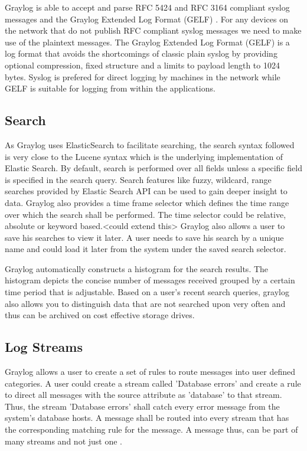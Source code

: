 \documentclass[9pt,twocolumn,twoside]{../../styles/osajnl}
\begin{document}
Graylog is able to accept and parse RFC 5424 \CE and RFC 3164 \CE compliant
syslog messages and the Graylog Extended Log Format (GELF)
\cite{www-graylog-sending_data}. For any devices on the network that
do not publish RFC compliant syslog messages we need to make use of
the plaintext messages.  The Graylog Extended Log Format (GELF)
is a
log format that avoids the shortcomings of classic plain syslog by
providing optional compression, fixed structure and a limits to
payload length to 1024 bytes. Syslog is prefered \SE for direct logging by
machines in the network while GELF is suitable for logging from within
the applications.

\subsection{Search}

As Graylog uses ElasticSearch to facilitate searching, the search
syntax followed is very close to the Lucene syntax which is the
underlying implementation of Elastic Search. By default, search is
performed over all fields unless a specific field is specified in the
search query. Search features like fuzzy, wildcard, range searches
provided by Elastic Search API can be used to gain deeper insight to
data.  Graylog also provides a time frame selector which defines the
time range over which the search shall be performed. The time selector
could be relative, absolute or keyword based.<could extend this>
Graylog also allows a user to save his searches to view it later. A
user needs to save his search by a unique name and could load it later
from the system under the saved search selector.

Graylog automatically constructs a histogram for the search
results. The histogram depicts the concise number of messages received
grouped by a certain time period that is adjustable.  Based on a
user’s recent search queries, graylog also allows you to distinguish
data that are not searched upon very often and thus can be archived on
cost effective storage drives.

\subsection{Log Streams}

Graylog allows a user to create a set of rules to route messages into
user defined categories. A user could create a stream called 'Database
errors' and create a rule to direct all messages with the source
attribute as 'database' to that stream. Thus, the stream 'Database
errors' shall catch every error message from the system's database
hosts. A message shall be routed into every stream that has the
corresponding matching rule for the message. A message thus, can be
part of many streams and not just one \cite{www-graylog-streams}.
\end{document}
